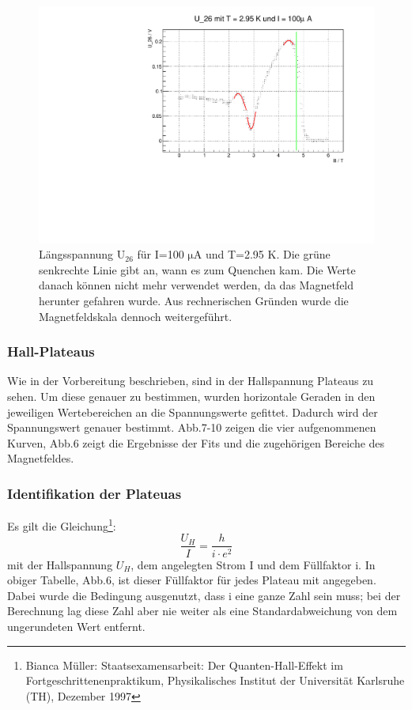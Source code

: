 \begin{figure}
\label{}
\centering
\includegraphics[scale = 0.5]{../plots/U_26_100muA_2950mK.pdf}
\caption{Längsspannung $\mathrm{U_{26}}$ für I=100 $\mathrm{\mu}$A und T=2.95 K. Die grüne senkrechte Linie gibt an, wann es zum Quenchen kam. Die Werte danach können nicht mehr verwendet werden, da das Magnetfeld herunter gefahren wurde. Aus rechnerischen Gründen wurde die Magnetfeldskala dennoch weitergeführt.}
\end{figure}

\newpage


\FloatBarrier

\subsubsection{Hall-Plateaus}
Wie in der Vorbereitung beschrieben, sind in der Hallspannung Plateaus zu sehen. Um diese genauer zu bestimmen, wurden horizontale Geraden in den jeweiligen Wertebereichen an die Spannungswerte gefittet. Dadurch wird der Spannungswert genauer bestimmt. Abb.7-10 zeigen die vier aufgenommenen Kurven, Abb.6 zeigt die Ergebnisse der Fits und die zugehörigen Bereiche des Magnetfeldes.


\subsubsection{Identifikation der Plateuas}
Es gilt die Gleichung\footnote{Bianca Müller: Staatsexamensarbeit: Der Quanten-Hall-Effekt im Fortgeschrittenenpraktikum, Physikalisches Institut der Universität Karlsruhe (TH), Dezember 1997}: 
$$\frac{U_H}{I} = \frac{h}{i \cdot e^{2}} $$
mit der Hallspannung $U_H$, dem angelegten Strom I und dem Füllfaktor i. In obiger Tabelle, Abb.6, ist dieser Füllfaktor für jedes Plateau mit angegeben. Dabei wurde die Bedingung ausgenutzt, dass i eine ganze Zahl sein muss; bei der Berechnung lag diese Zahl aber nie weiter als eine Standardabweichung von dem ungerundeten Wert entfernt.


